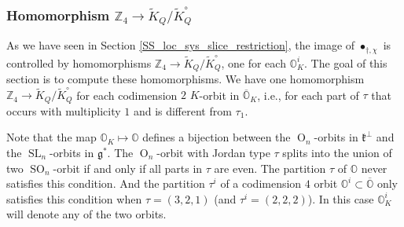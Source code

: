 \documentclass[12pt]{amsart}
\newcommand{\g}{\mathfrak{g}}
\newcommand{\Orb}{\mathbb{O}}
\newcommand{\Z}{\mathbb{Z}}
\newcommand{\kf}{\mathfrak{k}}
\theoremstyle{definition}
\numberwithin{equation}{section}
\begin{document}

\subsubsection{Homomorphism $\Z_4\rightarrow \tilde{K}_Q/\tilde{K}_Q^\circ$}\label{SSS_Z4_homom_typeA}
As we have seen in Section \ref{SS_loc_sys_slice_restriction}, the image of $\bullet_{\dagger,\chi}$
is controlled by homomorphisms $\Z_4\rightarrow \tilde{K}_Q/\tilde{K}_Q^\circ$, one for each $\Orb_K^i$.
The goal of this section is to compute these
homomorphisms. We have one homomorphism $\Z_4\rightarrow \tilde{K}_Q/\tilde{K}_Q^\circ$ for each codimension $2$ $K$-orbit in
$\overline{\Orb}_K$, i.e.,
for each part of $\tau$ that occurs with multiplicity $1$ and is different from
$\tau_1$.

Note that the map $\Orb_K\mapsto \Orb$
defines a bijection between the $\operatorname{O}_n$-orbits in $\kf^\perp$
and the $\operatorname{SL}_n$-orbits in $\g^*$. The $\operatorname{O}_n$-orbit
with Jordan type $\tau$ splits into the union of two $\operatorname{SO}_n$-orbit if
and only if all parts in $\tau$ are even. The partition $\tau$ of $\Orb$ never satisfies this condition.
And the partition  $\tau^i$ of a codimension $4$ orbit $\Orb^i\subset \overline{\Orb}$
only satisfies this condition when $\tau=(3,2,1)$ (and $\tau^i=(2,2,2)$).
In this case $\Orb_K^i$ will denote any of the two orbits.
\end{document}
